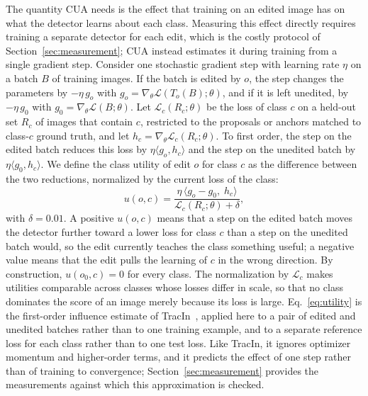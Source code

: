 \documentclass[conference]{IEEEtran}
\begin{document}
The quantity CUA needs is the effect that training on an edited image has on what the detector learns about each class. Measuring this effect directly requires training a separate detector for each edit, which is the costly protocol of Section~\ref{sec:measurement}; CUA instead estimates it during training from a single gradient step. Consider one stochastic gradient step with learning rate $\eta$ on a batch $B$ of training images. If the batch is edited by $o$, the step changes the parameters by $-\eta\,g_o$ with $g_o=\nabla_\theta\mathcal{L}(T_o(B);\theta)$, and if it is left unedited, by $-\eta\,g_0$ with $g_0=\nabla_\theta\mathcal{L}(B;\theta)$. Let $\mathcal{L}_c(R_c;\theta)$ be the loss of class $c$ on a held-out set $R_c$ of images that contain $c$, restricted to the proposals or anchors matched to class-$c$ ground truth, and let $h_c=\nabla_\theta\mathcal{L}_c(R_c;\theta)$. To first order, the step on the edited batch reduces this loss by $\eta\langle g_o,h_c\rangle$ and the step on the unedited batch by $\eta\langle g_0,h_c\rangle$. We define the class utility of edit $o$ for class $c$ as the difference between the two reductions, normalized by the current loss of the class:
\begin{equation}
u(o,c)=\frac{\eta\,\langle g_o-g_0,\;h_c\rangle}{\mathcal{L}_c(R_c;\theta)+\delta},
\label{eq:utility}
\end{equation}
with $\delta=0.01$. A positive $u(o,c)$ means that a step on the edited batch moves the detector further toward a lower loss for class $c$ than a step on the unedited batch would, so the edit currently teaches the class something useful; a negative value means that the edit pulls the learning of $c$ in the wrong direction. By construction, $u(o_0,c)=0$ for every class. The normalization by $\mathcal{L}_c$ makes utilities comparable across classes whose losses differ in scale, so that no class dominates the score of an image merely because its loss is large. Eq.~\eqref{eq:utility} is the first-order influence estimate of TracIn~\cite{pruthi2020tracin}, applied here to a pair of edited and unedited batches rather than to one training example, and to a separate reference loss for each class rather than to one test loss. Like TracIn, it ignores optimizer momentum and higher-order terms, and it predicts the effect of one step rather than of training to convergence; Section~\ref{sec:measurement} provides the measurements against which this approximation is checked.
\end{document}
